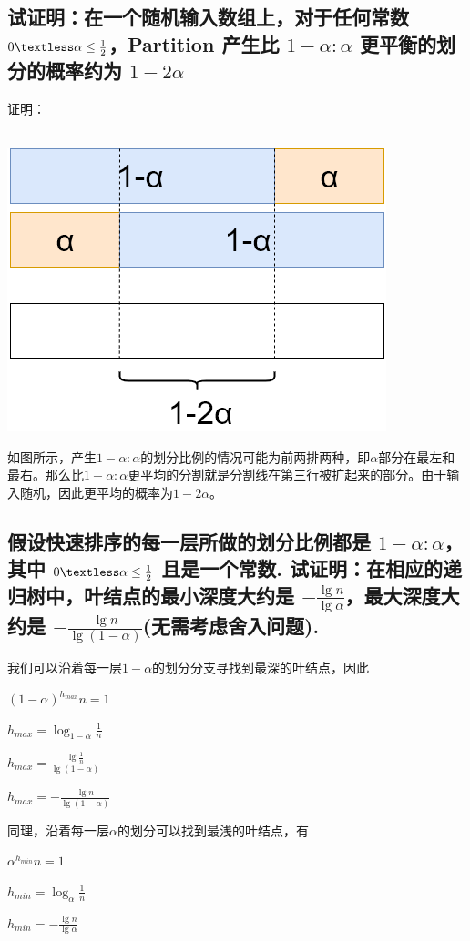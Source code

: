 \documentclass[UTF8]{ctexart}
\begin{document}
\subsection{试证明：在一个随机输入数组上，对于任何常数 $0 \textless \alpha \leq \frac{1}{2}$，Partition 产生比 $1-\alpha : \alpha$  更平衡的划分的概率约为 $1 - 2\alpha$}
证明：\\\\
\centerline{\includegraphics[scale=0.5]{img/2.png}}
如图所示，产生$1- \alpha:\alpha$的划分比例的情况可能为前两排两种，即$\alpha$部分在最左和最右。那么比$1- \alpha:\alpha$更平均的分割就是分割线在第三行被扩起来的部分。由于输入随机，因此更平均的概率为$1- 2\alpha$。

\subsection{假设快速排序的每一层所做的划分比例都是 $1-\alpha : \alpha$，其中 $0 \textless \alpha \leq \frac{1}{2}$ 且是一个常数. 试证明：在相应的递归树中，叶结点的最小深度大约是 $- \frac{\lg n}{\lg \alpha}$，最大深度大约是 $- \frac{\lg n}{\lg (1− \alpha)}$(无需考虑舍入问题).}
我们可以沿着每一层$1- \alpha$的划分分支寻找到最深的叶结点，因此\\
\centerline{$(1- \alpha)^{h_{max}}n=1$}
\centerline{$h_{max}=\log_{1- \alpha}{\frac{1}{n}}$}
\centerline{$h_{max}=\frac{\lg \frac{1}{n}}{\lg (1- \alpha)}$}
\centerline{$h_{max}=-  \frac{\lg n}{\lg (1- \alpha)}$}
同理，沿着每一层$\alpha$的划分可以找到最浅的叶结点，有\\
\centerline{$\alpha^{h_{min}}n=1$}
\centerline{$h_{min}=\log_{\alpha}{\frac{1}{n}}$}
\centerline{$h_{min}=-\frac{\lg n}{\lg \alpha}$}
\end{document}
